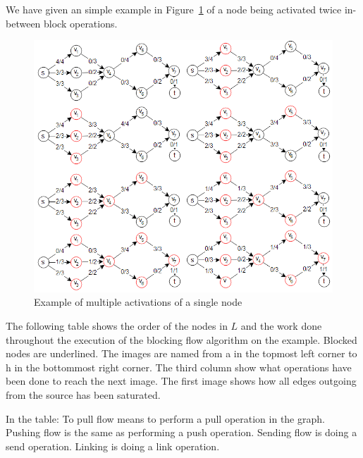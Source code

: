 We have given an simple example in Figure~\ref{GR-BadBlockingExample} of a node being activated twice in-between block operations.

\begin{figure}[ht!]
\centering
\includegraphics[width=120mm]{GRBadBlockingExample.png}
\caption{Example of multiple activations of a single node}
\label{GR-BadBlockingExample}
\end{figure}

The following table shows the order of the nodes in $L$ and the work done throughout the execution of the blocking flow algorithm on the example. Blocked nodes are underlined.
The images are named from a in the topmost left corner to h in the bottommost right corner. The third column show what operations have been done
to reach the next image. The first image shows how all edges outgoing from the source has been saturated.

In the table: To pull flow means to perform a pull operation in the graph. Pushing flow is the same as performing a push operation. Sending flow is doing a send operation.
Linking is doing a link operation.

